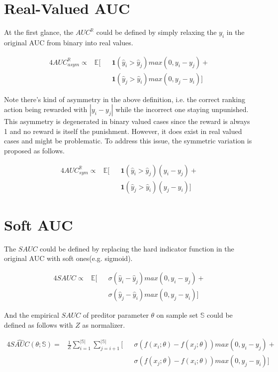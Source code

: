 \documentclass[sigconf]{acmart}
\newcommand{\ty}[1]{\hat{y}_{#1}}
\newcommand{\sF}[1]{f(x_{#1}; \theta)}
\newcommand{\SampleSet}{\mathbb{S}}
\newcommand{\RealAUC}{AUC^{\mathbb{R}}}
\newcommand{\SoftAUC}{SAUC}
\newcommand{\EmpSoftAUCExp}{\widehat{\SoftAUC}(\theta; \SampleSet)}
\newcommand{\SwapIndic}[5]{#1 ( #2{#3} #5 #2{#4} )}
\newcommand{\SwapIndicHardY}[2]{\SwapIndic{\textbf{1}}{\ty}{#1}{#2}{>}}
\newcommand{\SwapIndicSoftY}[2]{\SwapIndic{\sigma}{\ty}{#1}{#2}{-}}
\newcommand{\SwapIndicSoftF}[2]{\SwapIndic{\sigma}{\sF}{#1}{#2}{-}}
\newcommand{\SwapGainAsym}[2]{max(0, y_{#1} - y_{#2})}
\newcommand{\SwapGainSym}[2]{(y_{#1} - y_{#2})}
\begin{document}
\section{Real-Valued AUC}

At the first glance, the $\RealAUC$ could be defined by simply relaxing the $y_i$ in the original AUC from binary into real values.

\begin{alignat*}{4}
  \RealAUC_{asym} \propto & \mathbb{E} [ && \SwapIndicHardY{i}{j} \SwapGainAsym{i}{j}  + \\
                          &              && \SwapIndicHardY{j}{i} \SwapGainAsym{j}{i} ] 
\end{alignat*}

Note there's kind of asymmetry in the above definition, i.e. the correct ranking action being rewarded with $|y_i - y_j|$ while the incorrect one staying unpunished.
This asymmetry is degenerated in binary valued cases since the reward is always 1 and no reward is itself the punishment. 
However, it does exist in real valued cases and might be problematic.
To address this issue, the symmetric variation is proposed as follows.

\begin{alignat*}{4}
  \RealAUC_{sym} \propto & \mathbb{E} [ && \SwapIndicHardY{i}{j} \SwapGainSym{i}{j}  + \\
                         &              && \SwapIndicHardY{j}{i} \SwapGainSym{j}{i} ] 
\end{alignat*}

\section{Soft AUC}

The $\SoftAUC$ could be defined by replacing the hard indicator function in the original AUC with soft ones(e.g. sigmoid).

\begin{alignat*}{4}
  \SoftAUC \propto & \mathbb{E} [ && \SwapIndicSoftY{i}{j} \SwapGainAsym{i}{j}  + \\
                   &              && \SwapIndicSoftY{j}{i} \SwapGainAsym{j}{i} ] 
\end{alignat*}

And the empirical $\SoftAUC$ of preditor parameter $\theta$ on sample set $\SampleSet$ could be defined as follows with $Z$ as normalizer.

\begin{alignat*}{4}
  \EmpSoftAUCExp = & \frac{1}{Z} \sum\limits_{i=1}^{|\SampleSet|} \sum\limits_{j=i+1}^{|\SampleSet|} [ && \SwapIndicSoftF{i}{j} \SwapGainAsym{i}{j}  + \\
                   &                                                                                   && \SwapIndicSoftF{j}{i} \SwapGainAsym{j}{i} ] 
\end{alignat*}
\end{document}
